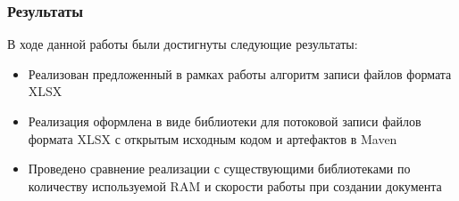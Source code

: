\documentclass{beamer}
\begin{document}
\begin{frame}\frametitle{Результаты}
В ходе данной работы были достигнуты следующие результаты:
\begin{itemize}
    \item Реализован предложенный в рамках работы алгоритм записи файлов формата XLSX
    \item Реализация оформлена в виде библиотеки для потоковой записи файлов формата XLSX с открытым исходным кодом и артефактов в Maven
    \item Проведено сравнение реализации с существующими библиотеками по количеству используемой RAM и скорости работы при создании документа
\end{itemize}
\end{frame}


\end{document}
